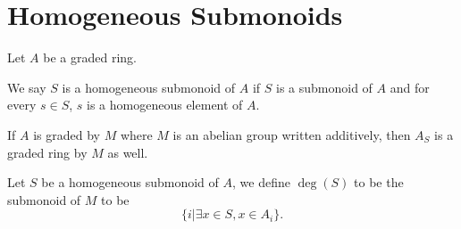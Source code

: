 \section{Homogeneous Submonoids}

Let $A$ be a graded ring.

\begin{definition}
We say $S$ is a homogeneous submonoid of $A$ if $S$ is a submonoid of $A$ and for every $s \in S$,
$s$ is a homogeneous element of $A$.
\leanok
{}
\end{definition}

\begin{theorem}
  If $A$ is graded by $M$ where $M$ is an abelian group written additively, then $A_{S}$ is a graded
ring by $M$ as well.
\leanok
{}
\end{theorem}

\begin{definition}
  Let $S$ be a homogeneous submonoid of $A$, we define $\deg(S)$ to be the submonoid of $M$ to be
  \[
    \{i | \exists x \in S, x \in A_i\}.
  \]
  \leanok
\end{definition}
